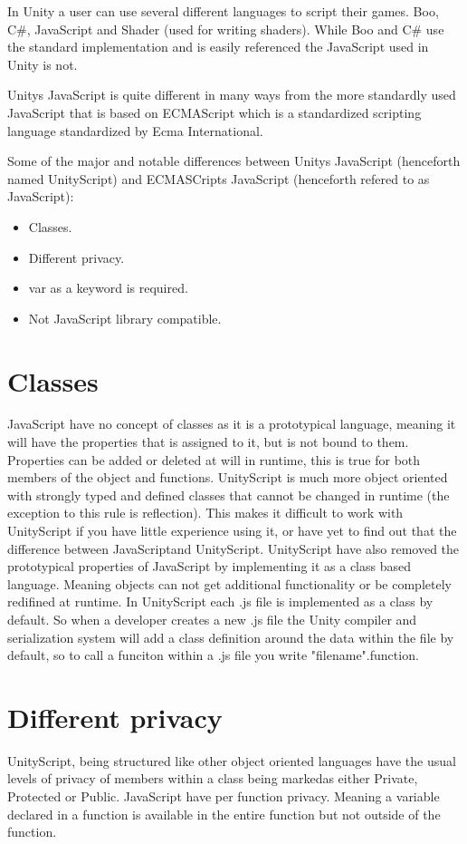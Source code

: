 In Unity a user can use several different languages to script their games. Boo, C\#, JavaScript and Shader (used for writing shaders).
While Boo and C\#  use the standard implementation and is easily referenced the JavaScript used in Unity is not.\cite{WikiScriptVSScript}

Unitys JavaScript is quite different in many ways from the more standardly used JavaScript that is based on ECMAScript\cite{ECMAscipt} which is a standardized scripting
language standardized by Ecma International.

Some of the major and notable differences between Unitys JavaScript (henceforth named UnityScript) and ECMASCripts JavaScript (henceforth refered to as JavaScript):

\begin{itemize}
	\item Classes.
	\item Different privacy.
	\item var as a keyword is required.
	\item Not JavaScript library compatible.
\end{itemize}

\section {Classes}
JavaScript have no concept of classes as it is a prototypical language, meaning it will have the properties that is assigned to it, but is not bound to them.
Properties can be added or deleted at will in runtime, this is true for both members of the object and functions. UnityScript is much more object oriented with strongly typed and defined classes that cannot be changed in runtime (the exception to this rule is reflection).
This makes it difficult to work with UnityScript if you have little experience using it, or have yet to find out that the difference between JavaScriptand UnityScript.
UnityScript have also removed the prototypical properties of JavaScript by implementing it as a class based language. Meaning objects can not get additional functionality or be completely redifined at runtime. In UnityScript each .js file is implemented as a class by default. So when a developer creates a new .js file the Unity compiler and serialization system will add a class definition around the data within the file by default, so to call a funciton within a .js file you write "filename".function.

\section {Different privacy}
UnityScript, being structured like other object oriented languages have the usual levels of privacy of members within a class being markedas either Private, Protected or Public. JavaScript have per function privacy. Meaning a variable declared in a function is available in the entire function but not outside of the function.

